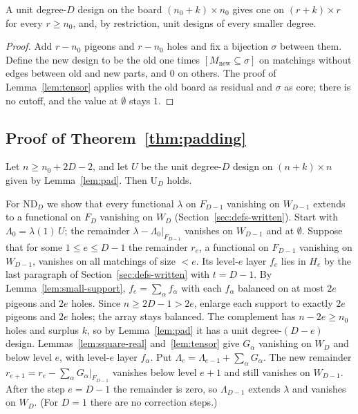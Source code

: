 \begin{lemma}\label{lem:pad}
A unit degree-$D$ design on the board $(n_0+k)\times n_0$ gives one on $(r+k)\times r$ for
every $r\ge n_0$, and, by restriction, unit designs of every smaller degree.
\end{lemma}

\begin{proof}
Add $r-n_0$ pigeons and $r-n_0$ holes and fix a bijection $\sigma$ between them.  Define the
new design to be the old one times $[M_{\mathrm{new}}\subseteq\sigma]$ on matchings without
edges between old and new parts, and $0$ on others.  The proof of Lemma~\ref{lem:tensor}
applies with the old board as residual and $\sigma$ as core; there is no cutoff, and the
value at $\emptyset$ stays $1$.
\end{proof}

\subsection{Proof of Theorem~\ref{thm:padding}}\label{sec:growth-proof}

Let $n\ge n_0+2D-2$, and let $U$ be the unit degree-$D$ design on $(n+k)\times n$ given by
Lemma~\ref{lem:pad}.  Then $\mathrm{U}_D$ holds.

For $\mathrm{ND}_D$ we show that every functional $\lambda$ on $F_{D-1}$ vanishing on
$W_{D-1}$ extends to a functional on $F_D$ vanishing on $W_D$
(Section~\ref{sec:defs-written}).  Start with $\Lambda_0=\lambda(1)\,U$; the remainder
$\lambda-\Lambda_0|_{F_{D-1}}$ vanishes on $W_{D-1}$ and at $\emptyset$.  Suppose that for
some $1\le e\le D-1$ the remainder $r_e$, a functional on $F_{D-1}$ vanishing on $W_{D-1}$,
vanishes on all matchings of size $<e$.  Its level-$e$ layer $f_e$ lies in $H_e$ by the last
paragraph of Section~\ref{sec:defs-written} with $t=D-1$.  By
Lemma~\ref{lem:small-support}, $f_e=\sum_\alpha f_\alpha$ with each $f_\alpha$ balanced on at
most $2e$ pigeons and $2e$ holes.  Since $n\ge 2D-1>2e$, enlarge each support to exactly
$2e$ pigeons and $2e$ holes; the array stays balanced.  The complement has $n-2e\ge n_0$
holes and surplus $k$, so by Lemma~\ref{lem:pad} it has a unit degree-$(D-e)$ design.
Lemmas~\ref{lem:square-real} and~\ref{lem:tensor} give $G_\alpha$ vanishing on $W_D$ and
below level $e$, with level-$e$ layer $f_\alpha$.  Put
$\Lambda_e=\Lambda_{e-1}+\sum_\alpha G_\alpha$.  The new remainder
$r_{e+1}=r_e-\sum_\alpha G_\alpha|_{F_{D-1}}$ vanishes below level $e+1$ and still vanishes
on $W_{D-1}$.  After the step $e=D-1$ the remainder is zero, so $\Lambda_{D-1}$ extends
$\lambda$ and vanishes on $W_D$.  (For $D=1$ there are no correction steps.)

